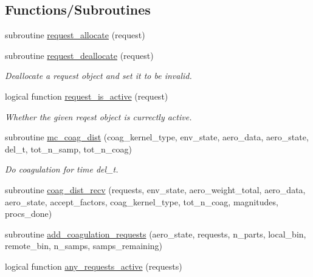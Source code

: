 \subsection*{Functions/\+Subroutines}
\begin{DoxyCompactItemize}
\item 
subroutine \mbox{\hyperlink{namespacepmc__coagulation__dist_afb4f993c6a05a78eac5532dc2eea2fca}{request\+\_\+allocate}} (request)
\item 
subroutine \mbox{\hyperlink{namespacepmc__coagulation__dist_a3a30ae518446f11900156387e90adc91}{request\+\_\+deallocate}} (request)
\begin{DoxyCompactList}\small\item\em Deallocate a request object and set it to be invalid. \end{DoxyCompactList}\item 
logical function \mbox{\hyperlink{namespacepmc__coagulation__dist_a2177c5bb512ea9262020b6928f2b5cba}{request\+\_\+is\+\_\+active}} (request)
\begin{DoxyCompactList}\small\item\em Whether the given reqest object is currectly active. \end{DoxyCompactList}\item 
subroutine \mbox{\hyperlink{namespacepmc__coagulation__dist_ae16e2850c2b268d077e91fac1f254660}{mc\+\_\+coag\+\_\+dist}} (coag\+\_\+kernel\+\_\+type, env\+\_\+state, aero\+\_\+data, aero\+\_\+state, del\+\_\+t, tot\+\_\+n\+\_\+samp, tot\+\_\+n\+\_\+coag)
\begin{DoxyCompactList}\small\item\em Do coagulation for time del\+\_\+t. \end{DoxyCompactList}\item 
subroutine \mbox{\hyperlink{namespacepmc__coagulation__dist_aa22e4e811fa31c5cd6049b4f216ac512}{coag\+\_\+dist\+\_\+recv}} (requests, env\+\_\+state, aero\+\_\+weight\+\_\+total, aero\+\_\+data, aero\+\_\+state, accept\+\_\+factors, coag\+\_\+kernel\+\_\+type, tot\+\_\+n\+\_\+coag, magnitudes, procs\+\_\+done)
\item 
subroutine \mbox{\hyperlink{namespacepmc__coagulation__dist_af4c13796261cf2c77fd2209a6d550184}{add\+\_\+coagulation\+\_\+requests}} (aero\+\_\+state, requests, n\+\_\+parts, local\+\_\+bin, remote\+\_\+bin, n\+\_\+samps, samps\+\_\+remaining)
\item 
logical function \mbox{\hyperlink{namespacepmc__coagulation__dist_a343ec0694b50e82dc5d833f42c9ed359}{any\+\_\+requests\+\_\+active}} (requests)

\end{DoxyCompactItemize}
